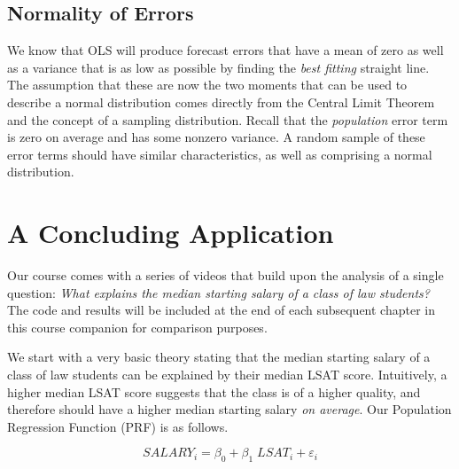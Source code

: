 \documentclass[
]{book}
\newenvironment{Shaded}{\begin{snugshade}}{\end{snugshade}}
\newcommand{\AttributeTok}[1]{\textcolor[rgb]{0.13,0.29,0.53}{#1}}
\newcommand{\DecValTok}[1]{\textcolor[rgb]{0.00,0.00,0.81}{#1}}
\newcommand{\FunctionTok}[1]{\textcolor[rgb]{0.13,0.29,0.53}{\textbf{#1}}}
\newcommand{\NormalTok}[1]{#1}
\newcommand{\OtherTok}[1]{\textcolor[rgb]{0.56,0.35,0.01}{#1}}
\newcommand{\SpecialCharTok}[1]{\textcolor[rgb]{0.81,0.36,0.00}{\textbf{#1}}}
\newcommand{\StringTok}[1]{\textcolor[rgb]{0.31,0.60,0.02}{#1}}
\begin{document}
\subsection{Normality of Errors}\label{normality-of-errors}

We know that OLS will produce forecast errors that have a mean of zero as well as a variance that is as low as possible by finding the \emph{best fitting} straight line. The assumption that these are now the two moments that can be used to describe a normal distribution comes directly from the Central Limit Theorem and the concept of a sampling distribution. Recall that the \emph{population} error term is zero on average and has some nonzero variance. A random sample of these error terms should have similar characteristics, as well as comprising a normal distribution.

\section{A Concluding Application}\label{a-concluding-application}

Our course comes with a series of videos that build upon the analysis of a single question: \emph{What explains the median starting salary of a class of law students?} The code and results will be included at the end of each subsequent chapter in this course companion for comparison purposes.

We start with a very basic theory stating that the median starting salary of a class of law students can be explained by their median LSAT score. Intuitively, a higher median LSAT score suggests that the class is of a higher quality, and therefore should have a higher median starting salary \emph{on average}. Our Population Regression Function (PRF) is as follows.

\[SALARY_i = \beta_0 + \beta_1 \; LSAT_i + \varepsilon_i\]

\begin{Shaded}
\end{Shaded}
\end{document}
